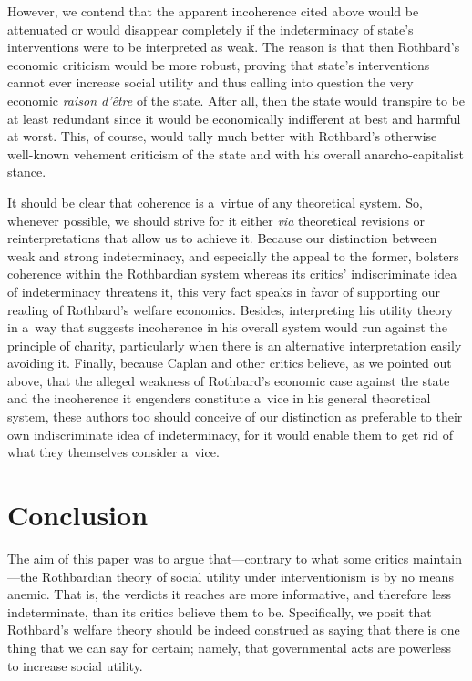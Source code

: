 However, we contend that the apparent incoherence cited above would be attenuated or would disappear completely if the indeterminacy of state's interventions were to be interpreted as weak. The reason is that then Rothbard's economic criticism would be more robust, proving that state's interventions cannot ever increase social utility and thus calling into question the very economic \textit{raison d'être} of the state. After all, then the state would transpire to be at least redundant since it would be economically indifferent at best and harmful at worst. This, of course, would tally much better with Rothbard's otherwise well-known vehement criticism of the state and with his overall anarcho-capitalist stance.



It should be clear that coherence is a~virtue of any theoretical system. So, whenever possible, we should strive for it either \textit{via} theoretical revisions or reinterpretations that allow us to achieve it. Because our distinction between weak and strong indeterminacy, and especially the appeal to the former, bolsters coherence within the Rothbardian system whereas its critics' indiscriminate idea of indeterminacy threatens it, this very fact speaks in favor of supporting our reading of Rothbard's welfare economics. Besides, interpreting his utility theory in a~way that suggests incoherence in his overall system would run against the principle of charity, particularly when there is an alternative interpretation easily avoiding it. Finally, because Caplan and other critics believe, as we pointed out above, that the alleged weakness of Rothbard's economic case against the state and the incoherence it engenders constitute a~vice in his general theoretical system, these authors too should conceive of our distinction as preferable to their own indiscriminate idea of indeterminacy, for it would enable them to get rid of what they themselves consider a~vice.



\section{Conclusion }

The aim of this paper was to argue that---contrary to what some critics maintain---the Rothbardian theory of social utility under interventionism is by no means anemic. That is, the verdicts it reaches are more informative, and therefore less indeterminate, than its critics believe them to be. Specifically, we posit that Rothbard's welfare theory should be indeed construed as saying that there is one thing that we can say for certain; namely, that governmental acts are powerless to increase social utility.



